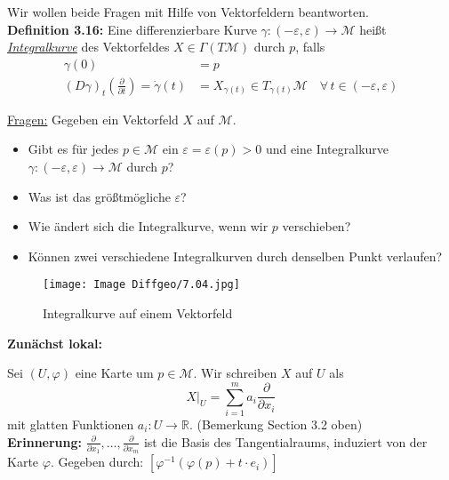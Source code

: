\documentclass[fleqn, 12pt, letterpaper]{article}
\newcommand{\deldel}[2]{\frac{\partial #1}{\partial #2}}
\begin{document}
\vspace{0.3cm}

Wir wollen beide Fragen mit Hilfe von Vektorfeldern beantworten.\\

\textbf{Definition 3.16:}  
Eine differenzierbare Kurve \(\gamma: (-\varepsilon, \varepsilon) \to \mathcal{M}\) heißt \emph{\underline{Integralkurve}} des Vektorfeldes \(X \in \Gamma(T\mathcal{M})\) durch \(p\), falls
\begin{align*}
\gamma(0) &= p \tag{1} \\
(D\gamma)_t(\deldel{}{t})=\dot{\gamma}(t) &= X_{\gamma(t)}\in T_{\gamma(t)}\mathcal{M} \quad \forall\, t \in (-\varepsilon, \varepsilon) \tag{2}
\end{align*}

\vspace{0.5em}

\underline{Fragen:} Gegeben ein Vektorfeld \(X\) auf \(\mathcal{M}\).
\begin{itemize}
  \item Gibt es für jedes \(p \in \mathcal{M}\) ein \(\varepsilon = \varepsilon(p) > 0\) und eine Integralkurve \(\gamma: (-\varepsilon, \varepsilon) \to \mathcal{M}\) durch \(p\)?
  \item Was ist das größtmögliche \(\varepsilon\)?
  \item Wie ändert sich die Integralkurve, wenn wir \(p\) verschieben?
  \item Können zwei verschiedene Integralkurven durch denselben Punkt verlaufen?
\end{itemize}
  \begin{figure}[H]
    \centering
    \texttt{[image: Image Diffgeo/7.04.jpg]}
	\caption{Integralkurve auf einem Vektorfeld}
 \end{figure}
\textbf{Zunächst lokal:}

Sei \((U, \varphi)\) eine Karte um \(p \in \mathcal{M}\).  
Wir schreiben \(X\) auf \(U\) als
\[
X|_U = \sum_{i=1}^m a_i \frac{\partial}{\partial x_i}
\]
mit glatten Funktionen \(a_i: U \to \mathbb{R}\). (Bemerkung Section 3.2 oben)\\

\textbf{Erinnerung:}
$\frac{\partial}{\partial x_1}, \dots, \frac{\partial}{\partial x_m}$
ist die Basis des Tangentialraums, induziert von der Karte $\varphi$. Gegeben durch:
$\left[ \varphi^{-1} \left( \varphi(p) + t \cdot e_i \right) \right]$


\vspace{0.3cm}
\end{document}
